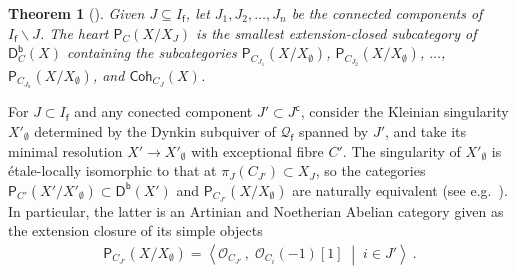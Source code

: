 \documentclass[reqno,a4paper]{amsart}
\newcommand{\scrO}{\mathscr{O}}
\newcommand{\sff}{\mathsf{f}}
\newcommand{\catP}{\mathsf{P}}
\newcommand{\catPC}{\mathsf{P}_{C}}
\newcommand{\catCoh}{\mathsf{Coh}}
\newcommand{\catDb}{\mathsf{D}^\mathsf{b}}
\newcommand{\catDbC}{\mathsf{D}^\mathsf{b}_C}
\newcommand{\qvfin}{\mathcal{Q}_\sff}
\newcommand{\rsv}{X}
\newcommand{\ssv}{X_\emptyset}
\newcommand{\psv}{X_J}
\newcommand{\Jcomp}{{J^\mathsf{c}}}
\theoremstyle{basic-theorem}
\newtheorem{theorem}{Theorem}[section]
\numberwithin{equation}{section}
\begin{document}
\begin{theorem}[{\cite[Theorem~5.23]{Shimpi_Torsion_pairs}}]\label{thm:structureofper}
    Given $J\subseteq I_\sff$, let $J_1,J_2,\ldots,J_n$ be the connected components of $I_\sff\smallsetminus J$. The heart $\catPC(\rsv/\psv)$ is the smallest extension-closed subcategory of $\catDbC(\rsv)$ containing the subcategories $\catP_{C_{J_1}}(\rsv/\ssv)$, $\catP_{C_{J_2}}(\rsv/\ssv)$, $\ldots$, $\catP_{C_{J_n}}(\rsv/\ssv)$, and $\catCoh_{C_J}(\rsv)$.
\end{theorem}

For $J\subset I_\sff$ and any conected component $J'\subset \Jcomp$, consider the Kleinian singularity $X'_\emptyset$ determined by the Dynkin subquiver of $\qvfin$ spanned by $J'$, and take its minimal resolution $X'\to X'_\emptyset$ with exceptional fibre $C'$. The singularity of $X'_\emptyset$ is étale-locally isomorphic to that at $\pi_J(C_{J'})\subset \psv$, so the categories $\catP_{C'}(\rsv'/X'_\emptyset)\subset \catDb(\rsv')$ and $\catP_{C_{J'}}(\rsv/\ssv)$ are naturally equivalent (see e.g.\ \cite[Corollary~2.9]{orlovFormalCompletionsIdempotent}). In particular, the latter is an Artinian and Noetherian Abelian category given as the extension closure of its simple objects
\begin{align}
	\catP_{C_{J'}}(\rsv/\ssv)=\left\langle \scrO_{C_{J'}}\,,\;
    \scrO_{C_i}(-1)[1] \;\middle\vert\;  i\in J' \right\rangle\ .
\end{align}
\end{document}
